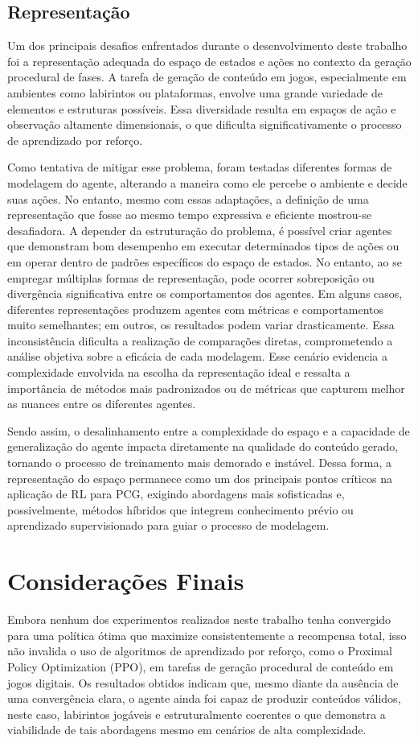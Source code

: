 \subsection{Representação}
Um dos principais desafios enfrentados durante o desenvolvimento deste trabalho foi a representação adequada 
do espaço de estados e ações no contexto da geração procedural de fases. A tarefa de geração de conteúdo em jogos, 
especialmente em ambientes como labirintos ou plataformas, envolve uma grande variedade de elementos e estruturas possíveis. 
Essa diversidade resulta em espaços de ação e observação altamente dimensionais, o que dificulta significativamente o 
processo de aprendizado por reforço.

Como tentativa de mitigar esse problema, foram testadas diferentes formas de modelagem do agente, 
alterando a maneira como ele percebe o ambiente e decide suas ações. No entanto, mesmo com essas adaptações, a 
definição de uma representação que fosse ao mesmo tempo expressiva e eficiente mostrou-se desafiadora. 
A depender da estruturação do problema, é possível criar agentes que demonstram bom desempenho em executar 
determinados tipos de ações ou em operar dentro de padrões específicos do espaço de estados. 
No entanto, ao se empregar múltiplas formas de representação, pode ocorrer sobreposição ou
divergência significativa entre os comportamentos dos agentes. Em alguns casos, diferentes representações 
produzem agentes com métricas e comportamentos muito semelhantes; em outros, os resultados podem variar drasticamente. 
Essa inconsistência dificulta a realização de comparações diretas, comprometendo a análise objetiva sobre a 
eficácia de cada modelagem. Esse cenário evidencia a complexidade envolvida na escolha da representação ideal e 
ressalta a importância de métodos mais padronizados ou de métricas que capturem melhor as nuances entre os diferentes agentes.

Sendo assim, o desalinhamento entre a complexidade do espaço e a capacidade de generalização do agente impacta 
diretamente na qualidade do conteúdo gerado, tornando o processo de treinamento mais demorado e instável. 
Dessa forma, a representação do espaço permanece como um dos principais pontos críticos na aplicação de RL para PCG, 
exigindo abordagens mais sofisticadas e, possivelmente, métodos híbridos que integrem conhecimento prévio ou aprendizado 
supervisionado para guiar o processo de modelagem.

\section{Considerações Finais}
Embora nenhum dos experimentos realizados neste trabalho tenha convergido para uma política ótima que maximize 
consistentemente a recompensa total, isso não invalida o uso de algoritmos de aprendizado por reforço, 
como o Proximal Policy Optimization (PPO), em tarefas de geração procedural de conteúdo em jogos digitais. 
Os resultados obtidos indicam que, mesmo diante da ausência de uma convergência clara, o agente ainda foi 
capaz de produzir conteúdos válidos, neste caso, labirintos jogáveis e estruturalmente coerentes o que 
demonstra a viabilidade de tais abordagens mesmo em cenários de alta complexidade.

